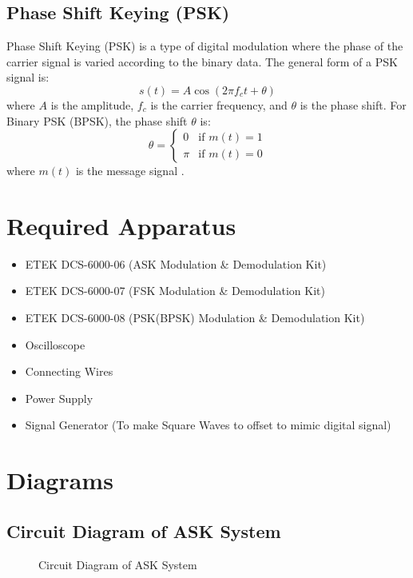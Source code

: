 \documentclass[12pt]{article}
\begin{document}
\subsection*{Phase Shift Keying (PSK)}
Phase Shift Keying (PSK) is a type of digital modulation where the phase of the carrier signal is varied according to the binary data. The general form of a PSK signal is:
\[
    s(t) = A \cos(2 \pi f_c t + \theta)
\]
where \( A \) is the amplitude, \( f_c \) is the carrier frequency, and \( \theta \) is the phase shift. For Binary PSK (BPSK), the phase shift \( \theta \) is:
\[
    \theta =
    \begin{cases}
        0   & \text{if } m(t) = 1 \\
        \pi & \text{if } m(t) = 0
    \end{cases}
\]
where \( m(t) \) is the message signal \cite{lathi2009modern}.


\section*{Required Apparatus}
\begin{itemize}
    \item ETEK DCS-6000-06 (ASK Modulation \& Demodulation Kit)
    \item ETEK DCS-6000-07 (FSK Modulation \& Demodulation Kit)
    \item ETEK DCS-6000-08 (PSK(BPSK) Modulation \& Demodulation Kit)
    \item Oscilloscope
    \item Connecting Wires
    \item Power Supply
    \item Signal Generator (To make Square Waves to offset to mimic digital signal)
\end{itemize}

\section*{Diagrams}
\subsection*{Circuit Diagram of ASK System}
\begin{figure}[H]
    \centering
    \caption{Circuit Diagram of ASK System}
    \label{fig:ask}
\end{figure}
\end{document}
